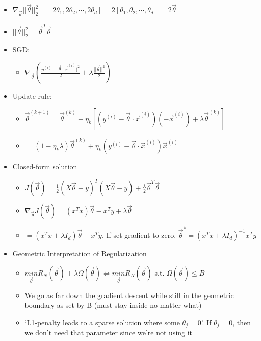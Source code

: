 \documentclass[10pt, oneside]{article}
\begin{document}
\begin{itemize}
\begin{itemize}
\begin{itemize}
            \item $\nabla_{\vec \theta} ||\vec \theta||_2 ^2 = [2\theta_1, 2\theta_2, \cdots, 2\theta_d] = 2 [\theta_1, \theta_2, \cdots, \theta_d] =2\vec \theta$
            \item $||\vec \theta||_2 ^2 = \vec \theta ^T \vec \theta$
            \item SGD:
            \begin{itemize}
                \item $\nabla_{\vec \theta} (\frac{y^{(i)} - \vec \theta \cdot \vec x ^{(i)})^2}{2} + \lambda \frac{||\vec \theta||^2}{2})$
            \end{itemize}
            \item Update rule:
            \begin{itemize}
                \item $\vec \theta ^{(k+1)} = \vec \theta^{(k)} - \eta_k [(y^{(i)} - \vec \theta \cdot \vec x^{(i)} )( -\vec x^{(i)}) + \lambda \vec \theta^{(k)}]$
                \item $=(1-\eta_k \lambda) \vec \theta^{(k)} + \eta_k (y^{(i)} - \vec \theta \cdot \vec x ^{(i)}) \vec x^{(i)}$
            \end{itemize}
            \item Closed-form solution
            \begin{itemize}
                \item $J(\vec \theta) = \frac{1}{2} (X\vec \theta - y)^T (X\vec \theta - y) + \frac{\lambda}{2} \vec \theta ^T \vec \theta$
                \item $\nabla_{\vec \theta} J(\vec \theta) = (x^T x) \vec \theta - x^T y + \lambda \vec \theta$
                \item $=(x^T x + \lambda I_d ) \vec \theta -x^Ty$. If set gradient to zero. $\vec \theta^* = (x^T x + \lambda I_d )^{-1} x^T y$
            \end{itemize}
            \item Geometric Interpretation of Regularization
            \begin{itemize}
                \item $\underset{\vec \theta}{min} R_N (\vec \theta) + \lambda \Omega(\vec \theta) \Leftrightarrow \underset{\vec \theta}{min} R_N(\vec \theta)$ s.t. $\Omega(\vec \theta) \leq B$
                \item We go as far down the gradient descent while still in the geometric boundary as set by B (must stay inside no matter what) 
                \item `L1-penalty leads to a sparse solution where some $\theta_j = 0$'. If $\theta_j = 0$, then we don't need that parameter since we're not using it

\end{itemize}
\end{itemize}
\end{itemize}
\end{itemize}
\end{document}
